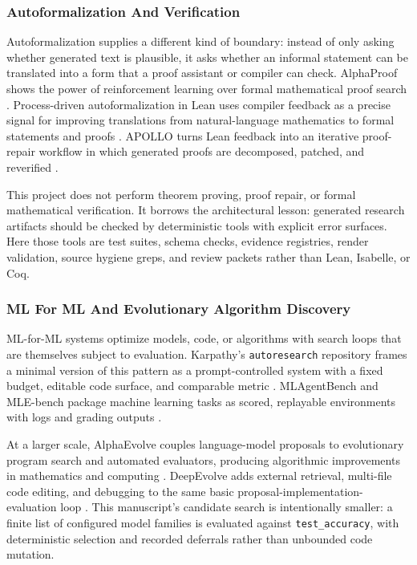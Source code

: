 \documentclass[
]{article}
\begin{document}
\subsubsection{Autoformalization And
Verification}\label{sec:autoformalization-verification}

Autoformalization supplies a different kind of boundary: instead of only
asking whether generated text is plausible, it asks whether an informal
statement can be translated into a form that a proof assistant or
compiler can check. AlphaProof shows the power of reinforcement learning
over formal mathematical proof search \citep{hubert_alphaproof_2025}.
Process-driven autoformalization in Lean uses compiler feedback as a
precise signal for improving translations from natural-language
mathematics to formal statements and proofs
\citep{lu_process_driven_autoformalization_2024}. APOLLO turns Lean
feedback into an iterative proof-repair workflow in which generated
proofs are decomposed, patched, and reverified
\citep{apollo_lean_collaboration_2025}.

This project does not perform theorem proving, proof repair, or formal
mathematical verification. It borrows the architectural lesson:
generated research artifacts should be checked by deterministic tools
with explicit error surfaces. Here those tools are test suites, schema
checks, evidence registries, render validation, source hygiene greps,
and review packets rather than Lean, Isabelle, or Coq.

\subsubsection{ML For ML And Evolutionary Algorithm
Discovery}\label{sec:ml-for-ml-evolutionary-discovery}

ML-for-ML systems optimize models, code, or algorithms with search loops
that are themselves subject to evaluation. Karpathy's
\texttt{autoresearch} repository frames a minimal version of this
pattern as a prompt-controlled system with a fixed budget, editable code
surface, and comparable metric \citep{karpathy_autoresearch_2026}.
MLAgentBench and MLE-bench package machine learning tasks as scored,
replayable environments with logs and grading outputs
\citep{huang_mlagentbench_2023, chan_mle_bench_2024}.

At a larger scale, AlphaEvolve couples language-model proposals to
evolutionary program search and automated evaluators, producing
algorithmic improvements in mathematics and computing
\citep{romera_paredes_alphaevolve_2025}. DeepEvolve adds external
retrieval, multi-file code editing, and debugging to the same basic
proposal-implementation-evaluation loop \citep{deepevolve_2025}. This
manuscript's candidate search is intentionally smaller: a finite list of
configured model families is evaluated against \texttt{test\_accuracy},
with deterministic selection and recorded deferrals rather than
unbounded code mutation.
\end{document}
